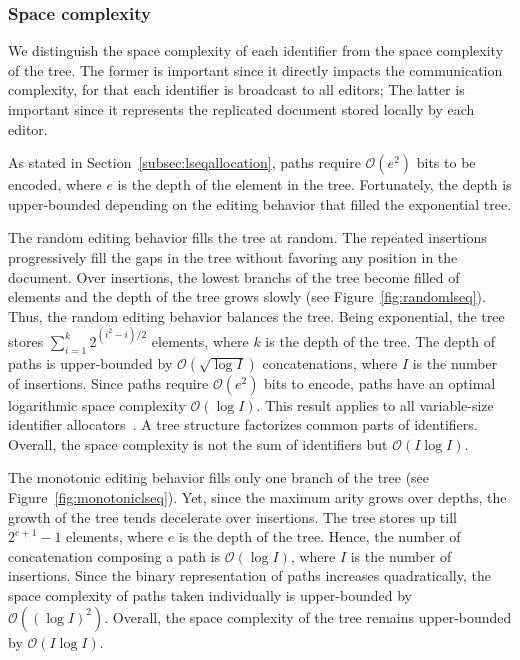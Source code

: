 \subsubsection{Space complexity}

We distinguish the space complexity of each identifier from the space complexity
of the tree. The former is important since it directly impacts the communication
complexity, for that each identifier is broadcast to all editors; The latter is
important since it represents the replicated document stored locally by each
editor.

As stated in Section~\ref{subsec:lseqallocation}, paths
require $\mathcal{O}(e^2)$ bits to be encoded,
where $e$ is the depth of the element in the tree. Fortunately, the depth is
upper-bounded depending on the editing behavior that filled the exponential
tree.

The random editing behavior fills the tree at random. The repeated insertions
progressively fill the gaps in the tree without favoring any position in the
document. Over insertions, the lowest branchs of the tree become filled of
elements and the depth of the tree grows slowly (see
Figure~\ref{fig:randomlseq}). Thus, the random editing behavior balances the
tree. Being exponential, the tree stores
$\textstyle\sum\nolimits_{i=1}^{k}{2^{(i^2-i)/2}}$ elements, where $k$ is the
depth of the tree. The depth of paths is upper-bounded by
$\mathcal{O}(\sqrt{\log I})$ concatenations, where $I$ is the number of
insertions. Since paths require $\mathcal{O}(e^2)$ bits to encode, paths have an
optimal logarithmic space complexity $\mathcal{O}(\log I)$. This result applies
to all variable-size identifier allocators~\cite{preguica2009commutative,
  weiss2009logoot}. A tree structure factorizes common parts of
identifiers. Overall, the space complexity is not the sum of identifiers but
$\mathcal{O}(I\log I)$.

The monotonic editing behavior fills only one branch of the tree (see
Figure~\ref{fig:monotoniclseq}). Yet, since the maximum arity grows over depths, the
growth of the tree tends decelerate over insertions. The tree stores up till
$2^{e+1}-1$ elements, where $e$ is the depth of the tree. Hence, the number of
concatenation composing a path is $\mathcal{O}(\log I)$, where $I$ is the number
of insertions. Since the binary representation of paths increases quadratically,
the space complexity of paths taken individually is upper-bounded by
$\mathcal{O}((\log I)^2)$.  Overall, the space complexity of the tree remains
upper-bounded by $\mathcal{O}(I\log I)$.

